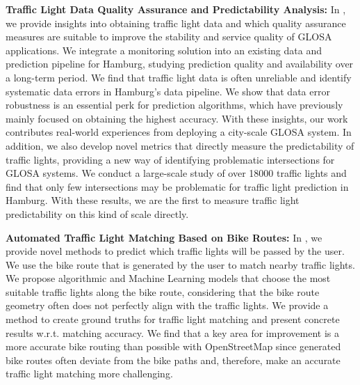 \textbf{\color{cidarkblue}Traffic Light Data Quality Assurance and Predictability Analysis:} In , we provide insights into obtaining traffic light data and which quality assurance measures are suitable to improve the stability and service quality of GLOSA applications. We integrate a monitoring solution into an existing data and prediction pipeline for Hamburg, studying prediction quality and availability over a long-term period. We find that traffic light data is often unreliable and identify systematic data errors in Hamburg's data pipeline. We show that data error robustness is an essential perk for prediction algorithms, which have previously mainly focused on obtaining the highest accuracy. With these insights, our work contributes real-world experiences from deploying a city-scale GLOSA system. In addition, we also develop novel metrics that directly measure the predictability of traffic lights, providing a new way of identifying problematic intersections for GLOSA systems. We conduct a large-scale study of over 18000 traffic lights and find that only few intersections may be problematic for traffic light prediction in Hamburg. With these results, we are the first to measure traffic light predictability on this kind of scale directly.

\textbf{\color{cidarkblue}Automated Traffic Light Matching Based on Bike Routes:} In , we provide novel methods to predict which traffic lights will be passed by the user. We use the bike route that is generated by the user to match nearby traffic lights. We propose algorithmic and Machine Learning models that choose the most suitable traffic lights along the bike route, considering that the bike route geometry often does not perfectly align with the traffic lights. We provide a method to create ground truths for traffic light matching and present concrete results w.r.t. matching accuracy. We find that a key area for improvement is a more accurate bike routing than possible with OpenStreetMap since generated bike routes often deviate from the bike paths and, therefore, make an accurate traffic light matching more challenging. 

